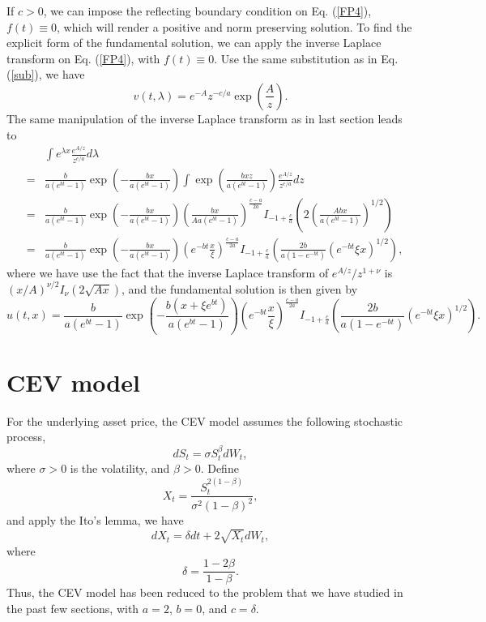 \documentclass[12pt]{article}
\begin{document}
    If $c>0$, we can impose the reflecting boundary condition on Eq. (\ref{FP4}), $f(t)\equiv 0$, which will render a positive
    and norm preserving solution. To find the 
    explicit form of the fundamental solution, we can apply the inverse Laplace transform on Eq. (\ref{FP4}), with $f(t)\equiv 0$.
    Use the same substitution as in Eq. (\ref{sub}),
    we have
    \begin{equation}
      v(t,\lambda) = e^{-A}z^{-c/a}\exp\left(\frac{A}{z}\right).
    \end{equation}
    The same manipulation of the inverse Laplace transform as in last section leads to
    \begin{eqnarray}
      &&\int e^{\lambda x} \frac{e^{A/z}}{z^{c/a}}d\lambda\nonumber\\
      &=& \frac{b}{a(e^{bt}-1)}\exp\left(-\frac{bx}{a(e^{bt}-1)}\right)\int \exp\left(\frac{bxz}{a(e^{bt}-1)}\right)\frac{e^{A/z}}{z^{c/a}}dz \nonumber\\
      &=& \frac{b}{a(e^{bt}-1)}\exp\left(-\frac{bx}{a(e^{bt}-1)}\right)\left(\frac{bx}{Aa(e^{bt}-1)}\right)^{\frac{c-a}{2a}}I_{-1+\frac{c}{a}}\left(2\left(\frac{Abx}{a(e^{bt}-1)}\right)^{1/2}\right) \nonumber\\
      &=& \frac{b}{a(e^{bt}-1)}\exp\left(-\frac{bx}{a(e^{bt}-1)}\right)\left(e^{-bt}\frac{x}{\xi}\right)^{\frac{c-a}{2a}}I_{-1+\frac{c}{a}}\left(\frac{2b}{a(1-e^{-bt})}\left(e^{-bt}\xi x\right)^{1/2}\right),
    \end{eqnarray}
    where we have use the fact that the inverse Laplace transform of $e^{A/z}/z^{1+\nu}$ is $(x/A)^{\nu/2}I_{\nu}(2\sqrt{Ax})$, 
    and the fundamental solution is then given by
    \begin{equation}
      u(t,x)=\frac{b}{a(e^{bt}-1)}\exp\left(-\frac{b(x+\xi e^{bt})}{a(e^{bt}-1)}\right)\left(e^{-bt}\frac{x}{\xi}\right)^{\frac{c-a}{2a}}I_{-1+\frac{c}{a}}\left(\frac{2b}{a(1-e^{-bt})}\left(e^{-bt}\xi x\right)^{1/2}\right).
      \label{reflecting}
    \end{equation}



\section{CEV model}

  For the underlying asset price, the CEV model assumes the following stochastic process,
  \begin{equation}
    dS_t=\sigma S_t^{\beta}dW_t,
  \end{equation}
  where $\sigma>0$ is the volatility, and $\beta>0$. Define \cite{Brecher}
  \begin{equation}
    X_t=\frac{S_t^{2(1-\beta)}}{\sigma^2(1-\beta)^2},
  \end{equation}
  and apply the Ito's lemma, we have
  \begin{equation}
    dX_t = \delta dt + 2\sqrt{X_t}dW_t,
  \end{equation}
  where
  \begin{equation}
    \delta = \frac{1-2\beta}{1-\beta}.
  \end{equation}
  Thus, the CEV model has been reduced to the problem that we have studied in the past few sections, with
  $a=2$, $b=0$, and $c=\delta$.
\end{document}
